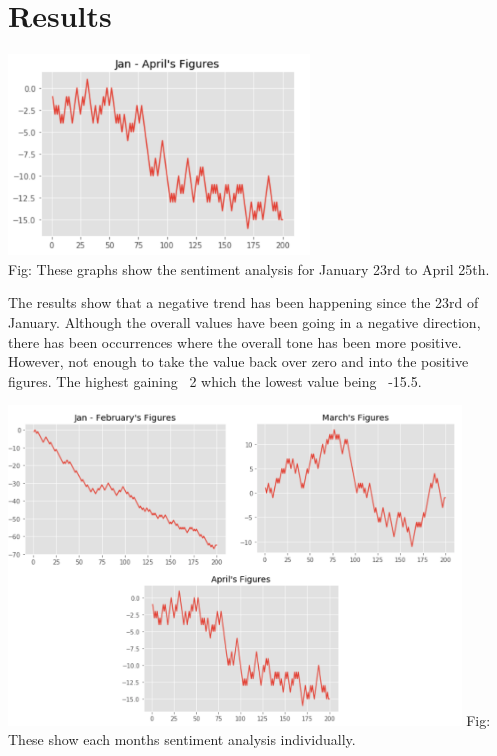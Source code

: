 \documentclass[a4paper,10pt]{article}
\begin{document}
\section{Results}


\begin{center}
	\label{confusion_matrix}
	\includegraphics[width=8cm]{allresults.png}
	\centering
	 \\Fig: These graphs show the sentiment analysis for January 23rd to April 25th. 
\end{center}

The results show that a negative trend has been happening since the 23rd of January. Although the overall values have been going in a negative direction, there has been occurrences where the overall tone has been more positive. However, not enough to take the value back over zero and into the positive figures. The highest gaining ~2 which the lowest value being ~-15.5.

\begin{center}
	\label{confusion_matrix}
	\includegraphics[width=12cm]{eachmonth2.png}
	Fig:  These show each months sentiment analysis individually.
\end{center}
\end{document}
